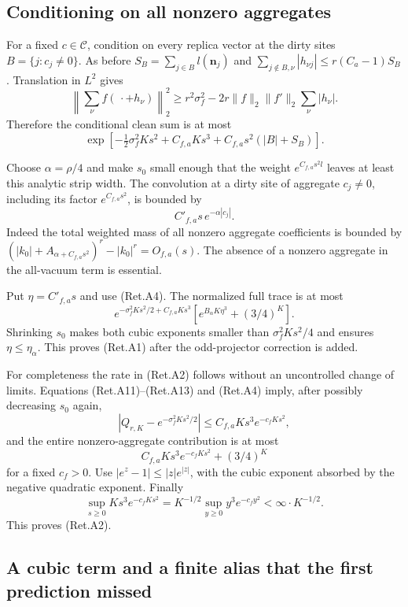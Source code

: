 \hypertarget{conditioning-on-all-nonzero-aggregates}{%
\subsection{Conditioning on all nonzero aggregates}\label{conditioning-on-all-nonzero-aggregates}}

For a fixed \(c\in\mathcal C\), condition on every replica vector
at the dirty sites \(B=\{j:c_j\ne0\}\).
As before \(S_B=\sum_{j\in B}l(\boldsymbol n_j)\) and
\(\sum_{j\notin B,\nu}|h_{\nu j}|\le r(C_a-1)S_B\).
Translation in \(L^2\) gives
\[
 \left\|\sum_\nu f(\,\cdot+h_\nu)\right\|_2^2
 \ge r^2\sigma_f^2
            -2r\|f\|_2\|f'\|_2\sum_\nu|h_\nu|.
\]
Therefore the conditional clean sum is at most
\[
 \exp\left[-\tfrac12\sigma_f^2Ks^2
                    +C_{f,a}Ks^3+C_{f,a}s^2(|B|+S_B)\right]. \tag{Ret.A12}
\]

Choose \(\alpha=\rho/4\) and make \(s_0\) small enough that the weight
\(e^{C_{f,a}s^2l}\) leaves at least this analytic strip width.
The convolution at a dirty site of aggregate \(c_j\ne0\), including
its factor \(e^{C_{f,a}s^2}\), is bounded by
\[
                         C'_{f,a}s\,e^{-\alpha|c_j|}.       \tag{Ret.A13}
\]
Indeed the total weighted mass of all nonzero aggregate coefficients
is bounded by
\((|k_0|+A_{\alpha+C_{f,a}s^2})^r-|k_0|^r=O_{f,a}(s)\).
The absence of a nonzero aggregate in the all-vacuum term is essential.

Put \(\eta=C'_{f,a}s\) and use (Ret.A4).
The normalized full trace is at most
\[
 e^{-\sigma_f^2Ks^2/2+C_{f,a}Ks^3}
          \left[e^{B_\alpha K\eta^3}+(3/4)^K\right].
\]
Shrinking \(s_0\) makes both cubic exponents smaller than
\(\sigma_f^2Ks^2/4\) and ensures \(\eta\le\eta_\alpha\).
This proves (Ret.A1) after the odd-projector correction is added.

For completeness the rate in (Ret.A2) follows without an uncontrolled
change of limits. Equations (Ret.A11)--(Ret.A13) and (Ret.A4) imply, after
possibly decreasing \(s_0\) again,
\[
 |Q_{r,K}-e^{-\sigma_f^2Ks^2/2}|
       \le C_{f,a}Ks^3e^{-c_fKs^2},
\]
and the entire nonzero-aggregate contribution is at most
\[
 C_{f,a}Ks^3e^{-c_fKs^2}+(3/4)^K
\]
for a fixed \(c_f>0\).
Use \(|e^z-1|\le|z|e^{|z|}\), with the cubic exponent absorbed
by the negative quadratic exponent.
Finally
\[
 \sup_{s\ge0}Ks^3e^{-c_fKs^2}
    =K^{-1/2}\sup_{y\ge0}y^3e^{-c_fy^2}<\infty\cdot K^{-1/2}.
\]
This proves (Ret.A2).

\hypertarget{a-cubic-term-and-a-finite-alias-that-the-first-prediction-missed}{%
\subsection{A cubic term and a finite alias that the first prediction missed}\label{a-cubic-term-and-a-finite-alias-that-the-first-prediction-missed}}


